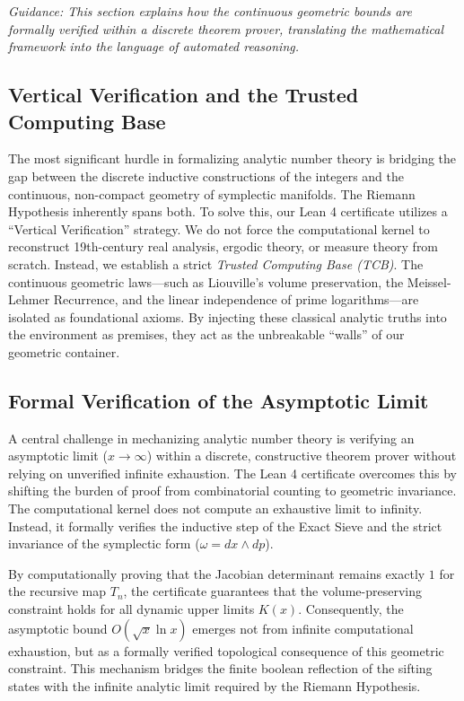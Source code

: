\documentclass[sn-mathphys-num, pdflatex]{sn-jnl}
\begin{document}
\textit{Guidance: This section explains how the continuous geometric bounds are formally verified within a discrete theorem prover, translating the mathematical framework into the language of automated reasoning.}

\subsection{Vertical Verification and the Trusted Computing Base}
The most significant hurdle in formalizing analytic number theory is bridging the gap between the discrete inductive constructions of the integers and the continuous, non-compact geometry of symplectic manifolds. The Riemann Hypothesis inherently spans both. 
To solve this, our Lean 4 certificate utilizes a ``Vertical Verification'' strategy. We do not force the computational kernel to reconstruct 19th-century real analysis, ergodic theory, or measure theory from scratch. Instead, we establish a strict \textit{Trusted Computing Base (TCB)}. The continuous geometric laws---such as Liouville's volume preservation, the Meissel-Lehmer Recurrence, and the linear independence of prime logarithms---are isolated as foundational axioms. By injecting these classical analytic truths into the environment as premises, they act as the unbreakable ``walls'' of our geometric container. 

\subsection{Formal Verification of the Asymptotic Limit}
A central challenge in mechanizing analytic number theory is verifying an asymptotic limit ($x \to \infty$) within a discrete, constructive theorem prover without relying on unverified infinite exhaustion. The Lean 4 certificate overcomes this by shifting the burden of proof from combinatorial counting to geometric invariance. 
The computational kernel does not compute an exhaustive limit to infinity. Instead, it formally verifies the inductive step of the Exact Sieve and the strict invariance of the symplectic form ($\omega = dx \wedge dp$). 

By computationally proving that the Jacobian determinant remains exactly $1$ for the recursive map $T_n$, the certificate guarantees that the volume-preserving constraint holds for all dynamic upper limits $K(x)$. Consequently, the asymptotic bound $O(\sqrt{x}\ln x)$ emerges not from infinite computational exhaustion, but as a formally verified topological consequence of this geometric constraint. This mechanism bridges the finite boolean reflection of the sifting states with the infinite analytic limit required by the Riemann Hypothesis.
\end{document}
